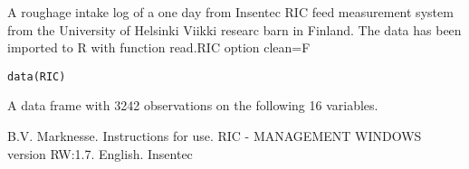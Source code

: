 \begin{Description}\relax
A roughage intake log of a one day from Insentec RIC feed measurement
system from the University of Helsinki Viikki researc barn in Finland.
The data has been imported to R with function read.RIC option clean=F
\end{Description}
\begin{Usage}
\begin{verbatim}data(RIC)\end{verbatim}
\end{Usage}
\begin{Format}\relax
A data frame with 3242 observations on the following 16 variables.
\end{Format}
\begin{References}\relax
B.V. Marknesse. Instructions for use. RIC - MANAGEMENT WINDOWS version
RW:1.7. English. Insentec
\end{References}

